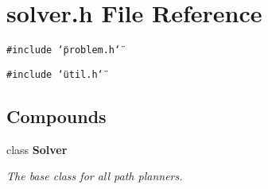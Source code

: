 \section{solver.h File Reference}
\label{solver_8h}
{\tt \#include \char`\"{}problem.h\char`\"{}}\par
{\tt \#include \char`\"{}util.h\char`\"{}}\par
\subsection*{Compounds}
\begin{CompactItemize}
\item 
class {\bf Solver}
\begin{CompactList}\small\item\em The base class for all path planners.\item\end{CompactList}\end{CompactItemize}

